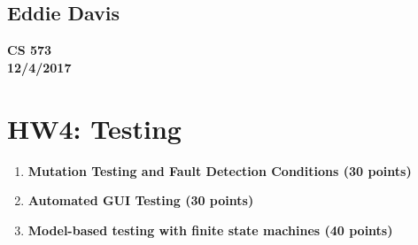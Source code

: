 \documentclass{report}
\begin{document}
\subsection*{Eddie Davis}
\textbf{CS 573}\\
\textbf{12/4/2017}\\

\section*{HW4: Testing}

\begin{enumerate}
	\item \textbf{Mutation Testing and Fault Detection Conditions (30 points)}

	\item \textbf{Automated GUI Testing (30 points)}
	
	\item \textbf{Model-based testing with finite state machines (40 points)}
	
\end{enumerate}
\end{document}
